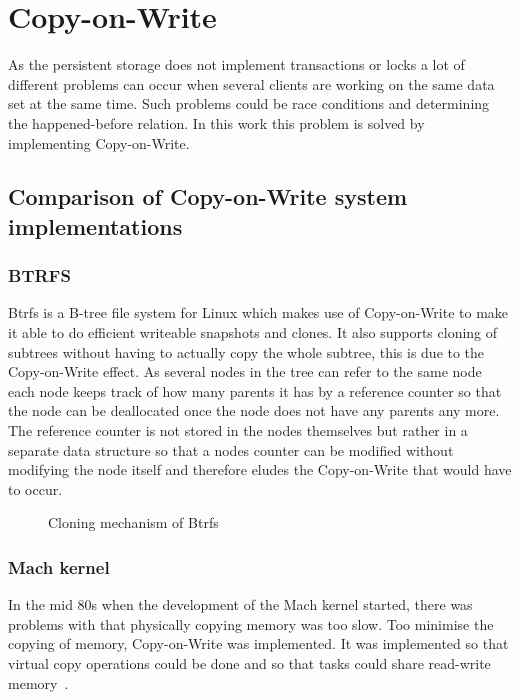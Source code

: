 \documentclass[a4paper,12pt]{article}
\begin{document}
\newpage 
\section{Copy-on-Write}
\label{sec:copy-on-write}
As the persistent storage does not implement transactions or locks a lot of different problems can occur when several 
clients are working on the same data set at the same time. Such problems could be race conditions and determining the 
happened-before relation. In this work this problem is solved by implementing Copy-on-Write.

\subsection{Comparison of Copy-on-Write system implementations}
\subsubsection{BTRFS}
Btrfs is a B-tree file system for Linux which makes use of Copy-on-Write to make it able to do efficient writeable 
snapshots and clones. It also supports cloning of subtrees without having to actually copy the whole subtree, 
this is due to the Copy-on-Write effect. As several nodes in the tree can refer to the same node each node keeps 
track of how many parents it has by a reference counter so that the node can be deallocated once the node does not 
have any parents any more. The reference counter is not stored in the nodes themselves but rather in a separate data 
structure so that a nodes counter can be modified without modifying the node itself and therefore eludes the 
Copy-on-Write that would have to occur.

\begin{figure}[htp] 
    \caption{Cloning mechanism of Btrfs~\cite{BTRFS}}
    \label{fig:btrfs_tree}
\end{figure}

\subsubsection{Mach kernel}
In the mid 80s when the development of the Mach kernel started, there was problems with that physically copying memory 
was too slow. Too minimise the copying of memory, Copy-on-Write was implemented. It was implemented so that virtual 
copy operations could be done and so that tasks could share read-write memory~\cite{MACH}.
\end{document}
